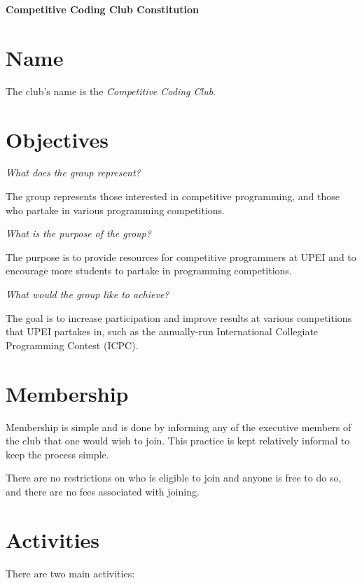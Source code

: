 \documentclass[11pt]{article}
\begin{document}
{\fontsize{20}{24}\center\bfseries Competitive Coding Club Constitution \par}

\section{Name}

The club's name is the \textit{Competitive Coding Club}.

\section{Objectives}

\textit{What does the group represent?}

\noindent
The group represents those interested in competitive programming, and those who partake in various programming competitions.

\vspace{2mm}
\noindent
\textit{What is the purpose of the group?}

\noindent
The purpose is to provide resources for competitive programmers at UPEI and to encourage more students to partake in programming competitions.

\vspace{2mm}
\noindent
\textit{What would the group like to achieve?}

\noindent
The goal is to increase participation and improve results at various competitions that UPEI partakes in, such as the annually-run International Collegiate Programming Contest (ICPC).

\section{Membership}

Membership is simple and is done by informing any of the executive members of the club that one would wish to join. This practice is kept relatively informal to keep the process simple.

\vspace{2mm}
\noindent
There are no restrictions on who is eligible to join and anyone is free to do so, and there are no fees associated with joining.

\section{Activities}

There are two main activities:
\end{document}
